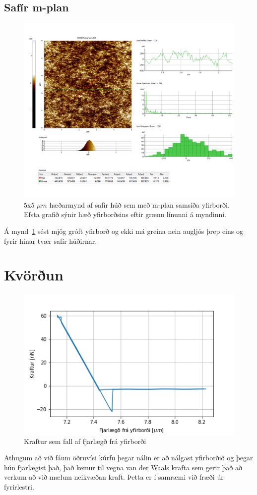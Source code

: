 \documentclass[11pt]{article}
\begin{document}
\subsection*{Safír m-plan}

\begin{figure}[H]
  \centering
    \includegraphics[width=130mm]{Safir-M/190221Topography013.png}
    \caption{$5$x$5$ $\mu m$ hæðarmynd af safír húð sem með m-plan samsíða yfirborði. Efsta grafið sýnir hæð yfirborðsins eftir grænu línunni á myndinni.}
    \label{fig:m-plan fjarmynd}
\end{figure}

Á mynd~\ref{fig:m-plan fjarmynd} sést mjög gróft yfirborð og ekki má greina nein augljós þrep eins og fyrir hinar tvær safír húðirnar. 


\section{Kvörðun}

\begin{figure}[H]
    \centering
    \includegraphics{forceDist.png}
    \caption{Kraftur sem fall af fjarlægð frá yfirborði}
    \label{fig:forceDist}
\end{figure}
Athugum að við fáum öðruvísi kúrfu þegar nálin er að nálgast yfirborðið og þegar hún fjarlægist það, það kemur til vegna van der Waals krafta sem gerir það að verkum að við mælum neikvæðan kraft. Þetta er í samræmi við fræði úr fyrirlestri.
\end{document}
